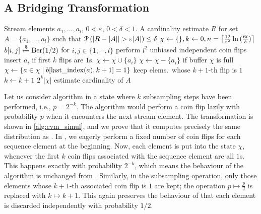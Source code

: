 \subsection{A Bridging Transformation}
\begin{algorithm}[t]
	\caption{Modified CVM algorithm with independent coin flips. The function last{\textunderscore}index returns the index of the last occurrence of an element in the sequence, before the current iteration.}\label{alg:cvm_simul}
	\begin{algorithmic}[1]
  \Require Stream elements $a_1,\dots,a_l$, $0 < \varepsilon$, $0 < \delta < 1$.
  \Ensure A cardinality estimate $R$ for set $A = \{ a_1,\dots,a_l \}$ such that $\prob \left( |R - |A| | > \varepsilon |A| \right) \leq \delta$
  \State $\chi \gets \{\}, k \gets 0, n = \ceil*{\frac{12}{\varepsilon^2} \ln{(\frac{6l}{\delta})} }$
  \State $b[i,j] \getsr \Ber(1/2)$ for $i,j \in \{1,\cdots,l\}$ \Comment perform $l^2$ unbiased independent coin flips
     \Comment insert $a_i$ if first $k$ flips are $1$s.
      \State $\chi \gets \chi \cup \{a_i\}$
    \Else
      \State $\chi \gets \chi - \{a_i\}$
    \EndIf
     \Comment if buffer $\chi$ is full
      \State $\chi \gets \{a \in \chi \;|\; b[\textrm{last{\textunderscore}index}(a),k+1] = 1\}$ \Comment keep elems.~whose $k+1$-th flip is $1$
      \State $k \gets k+1$
    \EndIf
  \EndFor
  \State \Return $2^k |\chi|$ \Comment estimate cardinality of $A$
  \end{algorithmic}
\end{algorithm}

Let us consider algorithm  in a state where $k$ subsampling steps have been performed, i.e., $p = 2^{-k}$.
The algorithm would perform a coin flip lazily with probability $p$ when it encounters the next stream element.
The transformation  is shown in \cref{alg:cvm_simul}, and we prove that it computes precisely the same distribution as .
In , we eagerly perform a fixed number of coin flips for each sequence element at the beginning.
Now, each element is put into the state $\chi$, whenever the first $k$ coin flips associated with the sequence element are all $1$s.
This happens exactly with probability $2^{-k}$, which means the behaviour of the algorithm is unchanged from .
Similarly, in the subsampling operation, only those elements whose $k+1$-th associated coin flip is $1$ are kept; the operation $p \mapsto \frac{p}{2}$ is replaced with $k \mapsto k+1$.
This again preserves the behaviour of  that each element is discarded independently with probability $1/2$.

